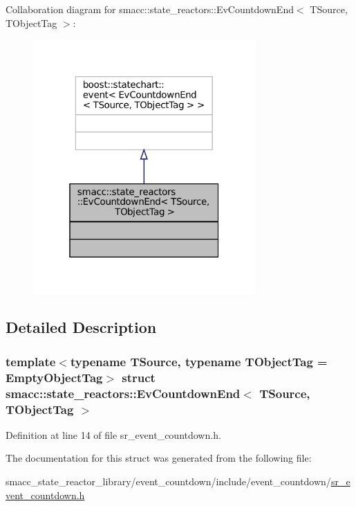 Collaboration diagram for smacc\+:\+:state\+\_\+reactors\+:\+:Ev\+Countdown\+End$<$ T\+Source, T\+Object\+Tag $>$\+:
\nopagebreak
\begin{figure}[H]
\begin{center}
\leavevmode
\includegraphics[width=241pt]{structsmacc_1_1state__reactors_1_1EvCountdownEnd__coll__graph}
\end{center}
\end{figure}


\subsection{Detailed Description}
\subsubsection*{template$<$typename T\+Source, typename T\+Object\+Tag = Empty\+Object\+Tag$>$\newline
struct smacc\+::state\+\_\+reactors\+::\+Ev\+Countdown\+End$<$ T\+Source, T\+Object\+Tag $>$}



Definition at line 14 of file sr\+\_\+event\+\_\+countdown.\+h.



The documentation for this struct was generated from the following file\+:\begin{DoxyCompactItemize}
\item 
smacc\+\_\+state\+\_\+reactor\+\_\+library/event\+\_\+countdown/include/event\+\_\+countdown/\hyperlink{sr__event__countdown_8h}{sr\+\_\+event\+\_\+countdown.\+h}\end{DoxyCompactItemize}
